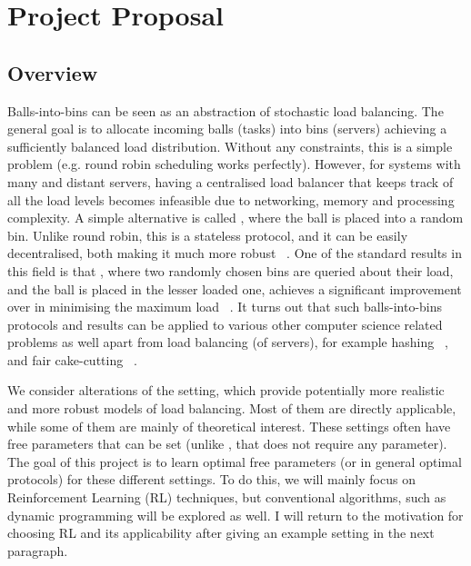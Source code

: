 \chapter{Project Proposal}\label{proposal} 

\section*{Overview}

Balls-into-bins can be seen as an abstraction of stochastic load balancing. The general goal is to allocate incoming balls (tasks) into bins (servers) achieving a sufficiently balanced load distribution. Without any constraints, this is a simple problem (e.g. round robin scheduling works  perfectly). However, for systems with many and distant servers, having a centralised load balancer that keeps track of all the load levels becomes infeasible due to networking, memory and processing complexity.  A simple alternative is called \OneChoice, where the ball is placed into a random bin. Unlike round robin, this is a stateless protocol, and it can be easily decentralised, both making it much more robust ~\cite{nasir2015power}. One of the standard results in this field is that \TwoChoice, where two randomly chosen bins are queried about their load, and the ball is placed in the lesser loaded one, achieves a significant improvement over \OneChoice in minimising the maximum load ~\cite{azar1999twochoice}. It turns out that such balls-into-bins protocols and results can be applied to various other computer science related problems as well apart from load balancing (of servers), for example hashing ~\cite{dahlgaard2016power}, and fair cake-cutting ~\cite{edmonds2006balanced}.

We consider alterations of the \TwoChoice setting, which provide potentially more realistic and more robust models of load balancing. Most of them are directly applicable, while some of them are mainly of theoretical interest. These settings often have free parameters that can be set (unlike \TwoChoice, that does not require any parameter). 
The goal of this project is to learn optimal free parameters (or in general optimal protocols) for these different settings. To do this, we will mainly focus on Reinforcement Learning (RL) techniques, but conventional algorithms, such as dynamic programming will be explored as well. I will return to the motivation for choosing RL and its applicability after giving an example setting in the next paragraph.

